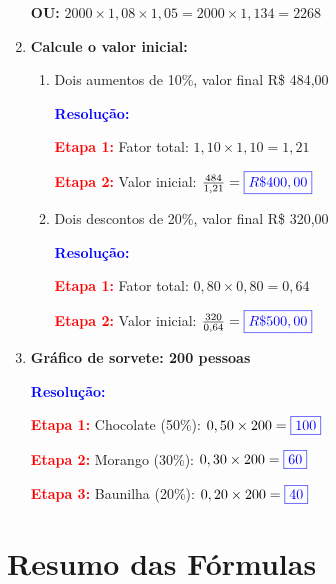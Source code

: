 \documentclass[11pt]{article}
\newcommand{\respostaNum}[1]{\textcolor{blue}{\boxed{#1}}}
\newcommand{\resolucao}{\textbf{\textcolor{blue}{Resolução:}}}
\begin{document}
\begin{multicols}{2}
\begin{enumerate}[leftmargin=*, start=15]
\textbf{OU:} $2000 \times 1,08 \times 1,05 = 2000 \times 1,134 = 2268$

\item \textbf{Calcule o valor inicial:}

\begin{enumerate}[label=\alph*)]
\item Dois aumentos de 10\%, valor final R\$ 484,00

\resolucao

\textbf{\textcolor{red}{Etapa 1:}} Fator total: $1,10 \times 1,10 = 1,21$

\textbf{\textcolor{red}{Etapa 2:}} Valor inicial: $\frac{484}{1,21} = \respostaNum{R\$ 400,00}$

\item Dois descontos de 20\%, valor final R\$ 320,00

\resolucao

\textbf{\textcolor{red}{Etapa 1:}} Fator total: $0,80 \times 0,80 = 0,64$

\textbf{\textcolor{red}{Etapa 2:}} Valor inicial: $\frac{320}{0,64} = \respostaNum{R\$ 500,00}$
\end{enumerate}

\item \textbf{Gráfico de sorvete: 200 pessoas}

\begin{center}
\end{center}

\resolucao

\textbf{\textcolor{red}{Etapa 1:}} Chocolate (50\%): $0,50 \times 200 = \respostaNum{100}$

\textbf{\textcolor{red}{Etapa 2:}} Morango (30\%): $0,30 \times 200 = \respostaNum{60}$

\textbf{\textcolor{red}{Etapa 3:}} Baunilha (20\%): $0,20 \times 200 = \respostaNum{40}$
\end{enumerate}

\section*{Resumo das Fórmulas}


\end{multicols}
\end{document}
